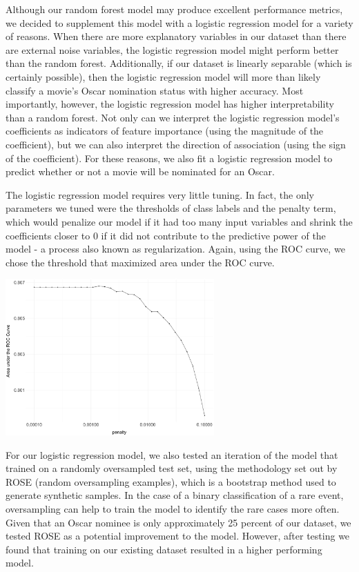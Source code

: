 \documentclass[10pt]{article}
\begin{document}
Although our random forest model may produce excellent performance metrics, we decided to supplement this model with a logistic regression model for a variety of reasons. When there are more explanatory variables in our dataset than there are external noise variables, the logistic regression model might perform better than the random forest. Additionally, if our dataset is linearly separable (which is certainly possible), then the logistic regression model will more than likely classify a movie’s Oscar nomination status with higher accuracy. Most importantly, however, the logistic regression model has higher interpretability than a random forest. Not only can we interpret the logistic regression model’s coefficients as indicators of feature importance (using the magnitude of the coefficient), but we can also interpret the direction of association (using the sign of the coefficient). For these reasons, we also fit a logistic regression model to predict whether or not a movie will be nominated for an Oscar. 

The logistic regression model requires very little tuning. In fact, the only parameters we tuned were the thresholds of class labels and the penalty term, which would penalize our model if it had too many input variables and shrink the coefficients closer to 0 if it did not contribute to the predictive power of the model - a process also known as regularization. Again, using the ROC curve, we chose the threshold that maximized area under the ROC curve. 

\begin{center}
\includegraphics[width=8cm]{_assets/log-reg-plots/log_reg__tuning-plot-roc-curve-1.png}
\end{center}

For our logistic regression model, we also tested an iteration of the model that trained on a randomly oversampled test set, using the methodology set out by ROSE (random oversampling examples), which is a bootstrap method used to generate synthetic samples. In the case of a binary classification of a rare event, oversampling can help to train the model to identify the rare cases more often. Given that an Oscar nominee is only approximately 25 percent of our dataset, we tested ROSE as a potential improvement to the model. However, after testing we found that training on our existing dataset resulted in a higher performing model.
\end{document}
